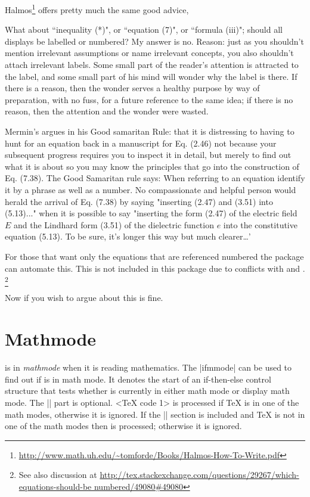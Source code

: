 {Halmos\footnote{\url{http://www.math.uh.edu/~tomforde/Books/Halmos-How-To-Write.pdf}} offers pretty much the same good advice,

\begin{latexquotation}
What about ``inequality (*)", or ``equation (7)", or ``formula (iii)"; should all displays be labelled or numbered? My answer is no. Reason: just as you shouldn't mention irrelevant assumptions or name irrelevant concepts, you also shouldn't attach irrelevant labels. Some small part of the reader's attention is attracted to the label, and some small part of his mind will wonder why the label is there. If there is a reason, then the wonder serves a healthy purpose by way of preparation, with no fuss, for a future reference to the same idea; if there is no reason, then the attention and the wonder were wasted.
\end{latexquotation}

Mermin's argues in his Good samaritan Rule: that it is distressing to having to hunt for an equation back in a manuscript for Eq. (2.46) not because your subsequent progress requires
you to inspect it in detail, but merely to find out what it is about so
you may know the principles that go into the construction of Eq. (7.38).
The Good Samaritan rule says: When referring to an equation identify it by
a phrase as well as a number. No compassionate and helpful person
would herald the arrival of Eq. (7.38) by saying "inserting (2.47) and (3.51)
into (5.13)..." when it is possible to say "inserting the form (2.47) of the
electric field $E$ and the Lindhard form (3.51) of the dielectric function $e$ into
the constitutive equation (5.13). To be sure, it's longer this way but much 
clearer\ldots'

For those that want only the equations that are referenced numbered the package  can automate this. This is not included in this package due to conflicts with  and .
\footnote{See also discussion at \protect\url{http://tex.stackexchange.com/questions/29267/which-equations-should-be numbered/49080\#49080}}

Now if you wish to argue about this is fine.

\section{Mathmode}

\tex is in \textit{mathmode} when it is reading mathematics. The |ifmmode| can be used to find out if \tex is in math mode. It denotes the start of an if-then-else control structure that tests whether \tex is currently in either math mode or display math mode. The |\else| part is optional. <TeX code 1> is processed if TeX is in one of the math modes, otherwise it is ignored. 
If the |\else| section is included and TeX is not in one of the math modes then  is processed; otherwise it is ignored.


}
